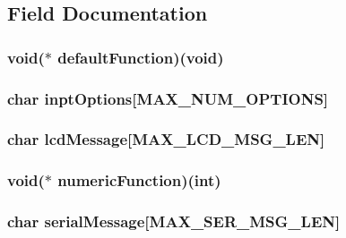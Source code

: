 \subsection{Field Documentation}
\hypertarget{struct_sub_menu_ad86a4714605654261200ef4194e1657c}{
\subsubsection[{default\+Function}]{\setlength{\rightskip}{0pt plus 5cm}void($\ast$ default\+Function)(void)}}\label{struct_sub_menu_ad86a4714605654261200ef4194e1657c}
\hypertarget{struct_sub_menu_aef0980fb751ef312c4ff945539aa3cd4}{
\subsubsection[{inpt\+Options}]{\setlength{\rightskip}{0pt plus 5cm}char inpt\+Options\mbox{[}{\bf M\+A\+X\+\_\+\+N\+U\+M\+\_\+\+O\+P\+T\+I\+O\+N\+S}\mbox{]}}}\label{struct_sub_menu_aef0980fb751ef312c4ff945539aa3cd4}
\hypertarget{struct_sub_menu_a10ce8be3d2bbadbc9c262b6be4bb3aec}{
\subsubsection[{lcd\+Message}]{\setlength{\rightskip}{0pt plus 5cm}char lcd\+Message\mbox{[}{\bf M\+A\+X\+\_\+\+L\+C\+D\+\_\+\+M\+S\+G\+\_\+\+L\+E\+N}\mbox{]}}}\label{struct_sub_menu_a10ce8be3d2bbadbc9c262b6be4bb3aec}
\hypertarget{struct_sub_menu_a1dae2f8dad8e2d2a30b13ee69ea542db}{
\subsubsection[{numeric\+Function}]{\setlength{\rightskip}{0pt plus 5cm}void($\ast$ numeric\+Function)(int)}}\label{struct_sub_menu_a1dae2f8dad8e2d2a30b13ee69ea542db}
\hypertarget{struct_sub_menu_a24706f7b55951b0e21967a256e107936}{
\subsubsection[{serial\+Message}]{\setlength{\rightskip}{0pt plus 5cm}char serial\+Message\mbox{[}{\bf M\+A\+X\+\_\+\+S\+E\+R\+\_\+\+M\+S\+G\+\_\+\+L\+E\+N}\mbox{]}}}\label{struct_sub_menu_a24706f7b55951b0e21967a256e107936}
